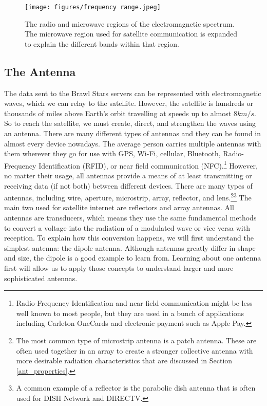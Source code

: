 \documentclass[10pt]{article}
\begin{document}
\begin{figure}[h!]
\centering
\texttt{[image: figures/frequency range.jpeg]}
\caption{The radio and microwave regions of the electromagnetic spectrum. The microwave region used for satellite communication is expanded to explain the different bands within that region\cite{freq_bands}.}
\label{fig:em_spectrum}
\end{figure}

\subsection{The Antenna}
\label{antenna}

The data sent to the Brawl Stars servers can be represented with electromagnetic waves, which we can relay to the satellite. However, the satellite is hundreds or thousands of miles above Earth's orbit travelling at speeds up to almost $8\si{km/s}$. So to reach the satellite, we must create, direct, and strengthen the waves using an antenna. There are many different types of antennas and they can be found in almost every device nowadays. The average person carries multiple antennas with them wherever they go for use with GPS, Wi-Fi, cellular, Bluetooth, Radio-Frequency Identification (RFID), or near field communication (NFC).\footnote{Radio-Frequency Identification and near field communication might be less well known to most people, but they are used in a bunch of applications including Carleton OneCards and electronic payment such as Apple Pay.} However, no matter their usage, all antennas provide a means of at least transmitting or receiving data (if not both) between different devices. There are many types of antennas, including wire, aperture, microstrip, array, reflector, and lens.\footnote{The most common type of microstrip antenna is a patch antenna. These are often used together in an array to create a stronger collective antenna with more desirable radiation characteristics that are discussed in Section \ref{ant_properties}.}\footnote{A common example of a reflector is the parabolic dish antenna that is often used for DISH Network and DIRECTV.} The main two used for satellite internet are reflectors and array antennas. All antennas are transducers, which means they use the same fundamental methods to convert a voltage into the radiation of a modulated wave or vice versa with reception. To explain how this conversion happens, we will first understand the simplest antenna: the dipole antenna. Although antennas greatly differ in shape and size, the dipole is a good example to learn from. Learning about one antenna first will allow us to apply those concepts to understand larger and more sophisticated antennas.
\end{document}
